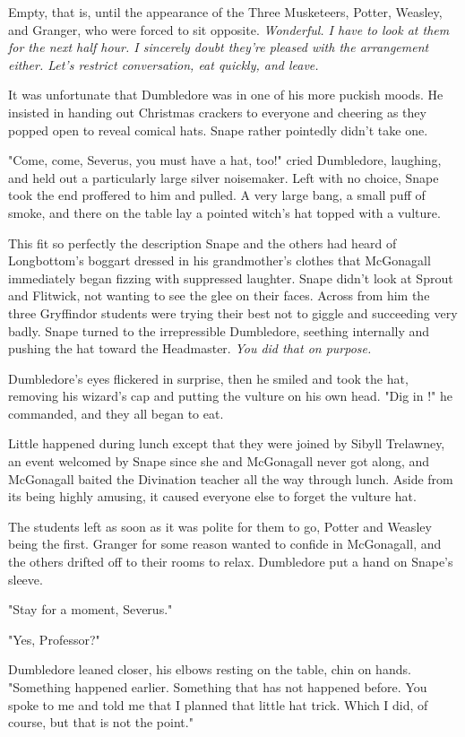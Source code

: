 \documentclass[a4paper,11pt]{article}
\begin{document}
Empty, that is, until the appearance of the Three Musketeers, Potter, Weasley, and Granger, who were forced to sit opposite. \emph{Wonderful. I have to look at them for the next half hour. I sincerely doubt they're pleased with the arrangement either. Let's restrict conversation, eat quickly, and leave.}

It was unfortunate that Dumbledore was in one of his more puckish moods. He insisted in handing out Christmas crackers to everyone and cheering as they popped open to reveal comical hats. Snape rather pointedly didn't take one.

"Come, come, Severus, you must have a hat, too!" cried Dumbledore, laughing, and held out a particularly large silver noisemaker. Left with no choice, Snape took the end proffered to him and pulled. A very large bang, a small puff of smoke, and there on the table lay a pointed witch's hat topped with a vulture.

This fit so perfectly the description Snape and the others had heard of Longbottom's boggart dressed in his grandmother's clothes that McGonagall immediately began fizzing with suppressed laughter. Snape didn't look at Sprout and Flitwick, not wanting to see the glee on their faces. Across from him the three Gryffindor students were trying their best not to giggle and succeeding very badly. Snape turned to the irrepressible Dumbledore, seething internally and pushing the hat toward the Headmaster. \emph{You did that on purpose.}

Dumbledore's eyes flickered in surprise, then he smiled and took the hat, removing his wizard's cap and putting the vulture on his own head. "Dig in !" he commanded, and they all began to eat.

Little happened during lunch except that they were joined by Sibyll Trelawney, an event welcomed by Snape since she and McGonagall never got along, and McGonagall baited the Divination teacher all the way through lunch. Aside from its being highly amusing, it caused everyone else to forget the vulture hat.

The students left as soon as it was polite for them to go, Potter and Weasley being the first. Granger for some reason wanted to confide in McGonagall, and the others drifted off to their rooms to relax. Dumbledore put a hand on Snape's sleeve.

"Stay for a moment, Severus."

"Yes, Professor?"

Dumbledore leaned closer, his elbows resting on the table, chin on hands. "Something happened earlier. Something that has not happened before. You spoke to me and told me that I planned that little hat trick. Which I did, of course, but that is not the point."
\end{document}
